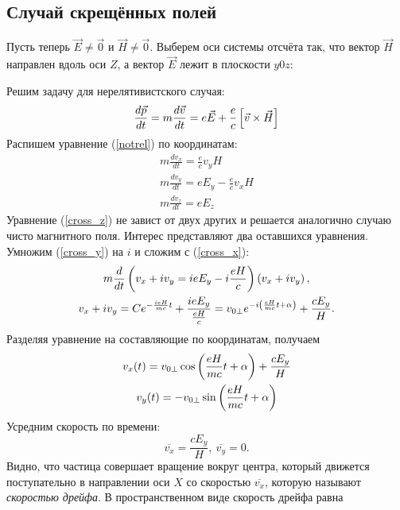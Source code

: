 \subsection{Случай скрещённых полей}
    Пусть теперь $\vec{E} \not= \vec{0}$ и $\vec{H} \not= \vec{0}$. Выберем оси системы отсчёта так, что вектор $\vec{H}$
    направлен вдоль оси $Z$, а вектор $\vec{E}$ лежит в плоскости $y0z$:
    \begin{figure*}[h]
        \centering{
            
        }
    \end{figure*}
    Решим задачу для нерелятивистского случая:
    \begin{equation}
        \frac{d\vec{p}}{dt} = m\frac{d\vec{v}}{dt} = e\vec{E} + \frac ec \left[{\vec{v}\times\vec{H}}\right] \label{notrel}
    \end{equation}
    Распишем уравнение (\ref{notrel}) по координатам:
    \begin{gather}
        m\frac{dv_x}{dt} = \frac ec v_y H \label{cross_x} \\
        m\frac{dv_y}{dt} = eE_y - \frac ec v_x H \label{cross_y} \\
        m\frac{dv_z}{dt} = eE_z \label{cross_z}
    \end{gather}
    Уравнение (\ref{cross_z}) не завист от двух других и решается аналогично случаю чисто магнитного поля.
    Интерес представляют два оставшихся уравнения. Умножим (\ref{cross_y}) на $i$ и сложим с (\ref{cross_x}):
    \begin{gather*}
        m\frac{d}{dt}\left({v_x + iv_y = ieE_y - i\frac{eH}{c}}\right)\left({v_x + iv_y}\right), \\
        v_x + iv_y = Ce^{-\frac{ieH}{mc}t} + \frac{ieE_y}{\frac{eH}{c}} = v_{0\perp}e^{-i\left({\frac{eH}{mc}t + \alpha}\right)} + \frac{cE_y}{H}.
    \end{gather*}
    Разделяя уравнение на составляющие по координатам, получаем
    \begin{gather*}
        v_x(t) = v_{0\perp}\cos\left({\frac{eH}{mc}t + \alpha}\right) + \frac{cE_y}{H} \\
        v_y(t) = - v_{0\perp}\sin\left({\frac{eH}{mc}t + \alpha}\right)
    \end{gather*}
    Усредним скорость по времени:
    \[
        \overline{v_x} = \frac{cE_y}{H}, \: \overline{v_y} = 0.
    \]
    Видно, что частица совершает вращение вокруг центра, который движется поступательно в направлении оси $X$ со скоростью
    $\overline{v_x}$, которую называют \textit{скоростью дрейфа}. В пространственном виде скорость дрейфа равна
